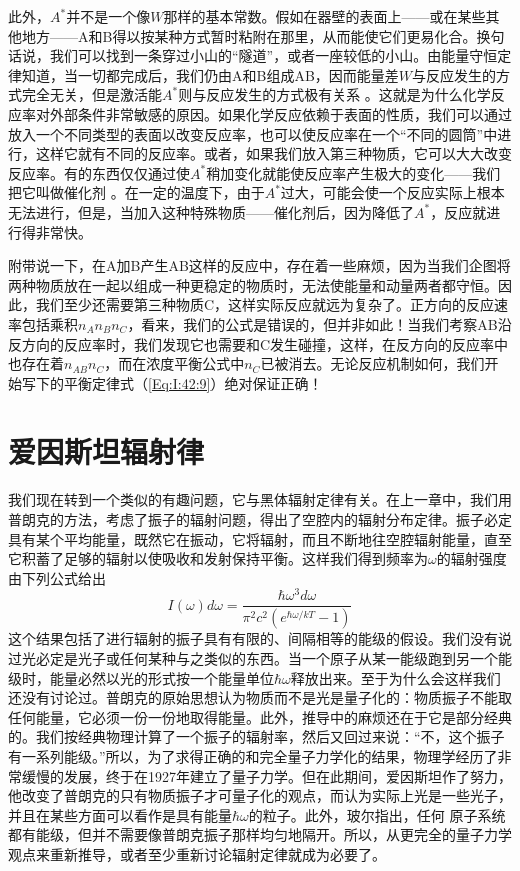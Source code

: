 此外，$A^*$并不是一个像$W$那样的基本常数。假如在器壁的表面上——或在某些其他地方——A和B得以按某种方式暂时粘附在那里，从而能使它们更易化合。换句话说，我们可以找到一条穿过小山的“隧道”，或者一座较低的小山。由能量守恒定律知道，当一切都完成后，我们仍由A和B组成AB，因而能量差$W$与反应发生的方式完全无关，但是激活能$A^*$则与反应发生的方式极有关系 。这就是为什么化学反应率对外部条件非常敏感的原因。如果化学反应依赖于表面的性质，我们可以通过放入一个不同类型的表面以改变反应率，也可以使反应率在一个“不同的圆筒”中进行，这样它就有不同的反应率。或者，如果我们放入第三种物质，它可以大大改变反应率。有的东西仅仅通过使$A^*$稍加变化就能使反应率产生极大的变化——我们把它叫做催化剂 。在一定的温度下，由于$A^*$过大，可能会使一个反应实际上根本无法进行，但是，当加入这种特殊物质——催化剂后，因为降低了$A^*$，反应就进行得非常快。

附带说一下，在A加B产生AB这样的反应中，存在着一些麻烦，因为当我们企图将两种物质放在一起以组成一种更稳定的物质时，无法使能量和动量两者都守恒。因此，我们至少还需要第三种物质C，这样实际反应就远为复杂了。正方向的反应速率包括乘积$n_A n_B n_C$，看来，我们的公式是错误的，但并非如此！当我们考察AB沿反方向的反应率时，我们发现它也需要和C发生碰撞，这样，在反方向的反应率中也存在着$n_{AB}n_C$，而在浓度平衡公式中$n_C$已被消去。无论反应机制如何，我们开始写下的平衡定律式（\ref{Eq:I:42:9}）绝对保证正确！

\section{爱因斯坦辐射律}

我们现在转到一个类似的有趣问题，它与黑体辐射定律有关。在上一章中，我们用普朗克的方法，考虑了振子的辐射问题，得出了空腔内的辐射分布定律。振子必定具有某个平均能量，既然它在振动，它将辐射，而且不断地往空腔辐射能量，直至它积蓄了足够的辐射以使吸收和发射保持平衡。这样我们得到频率为$\omega$的辐射强度由下列公式给出
\begin{equation}
    \label{Eq:I:42:12}
    I(\omega)d\omega = \frac{\hbar\omega^3d\omega}{\pi^2c^2(e^{\hbar\omega/kT}-1)}
\end{equation}
这个结果包括了进行辐射的振子具有有限的、间隔相等的能级的假设。我们没有说过光必定是光子或任何某种与之类似的东西。当一个原子从某一能级跑到另一个能级时，能量必然以光的形式按一个能量单位$\hbar\omega$释放出来。至于为什么会这样我们还没有讨论过。普朗克的原始思想认为物质而不是光是量子化的：物质振子不能取任何能量，它必须一份一份地取得能量。此外，推导中的麻烦还在于它是部分经典的。我们按经典物理计算了一个振子的辐射率，然后又回过来说：“不，这个振子有一系列能级。”所以，为了求得正确的和完全量子力学化的结果，物理学经历了非常缓慢的发展，终于在1927年建立了量子力学。但在此期间，爱因斯坦作了努力，他改变了普朗克的只有物质振子才可量子化的观点，而认为实际上光是一些光子，并且在某些方面可以看作是具有能量$\hbar\omega$的粒子。此外，玻尔指出，任何 原子系统都有能级，但并不需要像普朗克振子那样均匀地隔开。所以，从更完全的量子力学观点来重新推导，或者至少重新讨论辐射定律就成为必要了。

